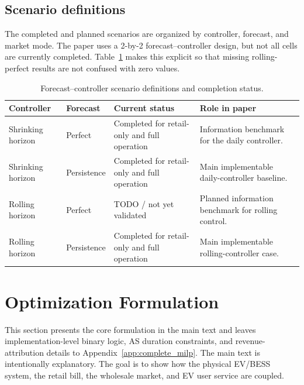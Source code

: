 \documentclass[final,5p,times]{elsarticle}
\begin{document}
\subsection{Scenario definitions}
The completed and planned scenarios are organized by controller, forecast, and market mode. The paper uses a 2-by-2 forecast--controller design, but not all cells are currently completed. Table~\ref{tab:scenario_definitions} makes this explicit so that missing rolling-perfect results are not confused with zero values.

\begin{table}[!t]
\centering
\caption{Forecast--controller scenario definitions and completion status.}
\label{tab:scenario_definitions}
\scriptsize
\begin{tabularx}{\textwidth}{@{}p{}p{}p{}X@{}}
\toprule
Controller & Forecast & Current status & Role in paper \\
\midrule
Shrinking horizon & Perfect & Completed for retail-only and full operation & Information benchmark for the daily controller.\\
Shrinking horizon & Persistence & Completed for retail-only and full operation & Main implementable daily-controller baseline.\\
Rolling horizon & Perfect & TODO / not yet validated & Planned information benchmark for rolling control.\\
Rolling horizon & Persistence & Completed for retail-only and full operation & Main implementable rolling-controller case.\\
\bottomrule
\end{tabularx}
\end{table}

\section{Optimization Formulation}
\label{sec:optimization}

This section presents the core formulation in the main text and leaves implementation-level binary logic, AS duration constraints, and revenue-attribution details to Appendix~\ref{app:complete_milp}. The main text is intentionally explanatory. The goal is to show how the physical EV/BESS system, the retail bill, the wholesale market, and EV user service are coupled.
\end{document}

